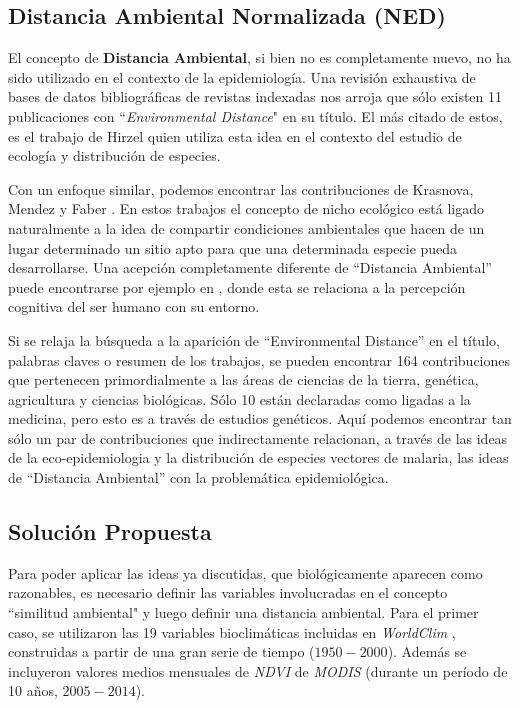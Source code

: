 \subsection{Distancia Ambiental Normalizada (NED)}

  \par El concepto de \textbf{Distancia Ambiental}, si bien no es completamente nuevo,
    no ha sido utilizado en el contexto de la epidemiología. Una revisión
    exhaustiva de bases de datos bibliográficas de revistas indexadas nos
    arroja que sólo existen 11 publicaciones con “\textit{Environmental Distance}"
    en su título. El más citado de estos, es el trabajo de Hirzel \cite{hirzel_distance}
    quien utiliza esta idea en el contexto del estudio de ecología y
    distribución de especies.

  \par Con un enfoque similar, podemos encontrar las contribuciones de Krasnova,
    Mendez y Faber \cite{krasnova_similarity, mendez_distance, farber_modeling}.
    En estos trabajos el concepto de nicho ecológico está ligado naturalmente a
    la idea de compartir condiciones ambientales que hacen de un lugar determinado
    un sitio apto para que una determinada especie pueda desarrollarse.
    Una acepción completamente diferente de ``Distancia Ambiental” puede
    encontrarse por ejemplo en \cite{montello_cognition}, donde esta se relaciona
    a la percepción cognitiva del ser humano con su entorno.

  \par Si se relaja la búsqueda a la aparición de ``Environmental Distance” en el
    título, palabras claves o resumen de los trabajos, se pueden encontrar 164
    contribuciones que pertenecen primordialmente a las áreas de ciencias de la
    tierra, genética, agricultura y ciencias biológicas.
    Sólo 10 están declaradas como ligadas a la medicina, pero esto es a través
    de estudios genéticos. Aquí podemos encontrar tan sólo un par de
    contribuciones \cite{tatem_env_coverage, altamirada_genetic} que
    indirectamente relacionan, a través de las ideas de la
    eco-epidemiologia y la distribución de especies vectores de malaria,
    las ideas de ``Distancia Ambiental” con la problemática epidemiológica.

\subsection{Solución Propuesta}
  \par Para poder aplicar las ideas ya discutidas, que biológicamente aparecen
    como razonables, es necesario definir las variables involucradas en el
    concepto ``similitud ambiental" y luego definir una distancia ambiental.
    Para el primer caso, se utilizaron las 19 variables bioclimáticas incluidas en
    \textit{WorldClim} \cite{wordclim}, construidas a partir de una gran serie
    de tiempo ($1950-2000$).
    Además se incluyeron valores medios mensuales de \textit{NDVI} de
    \textit{MODIS} (durante un período de 10 años, $2005-2014$).

